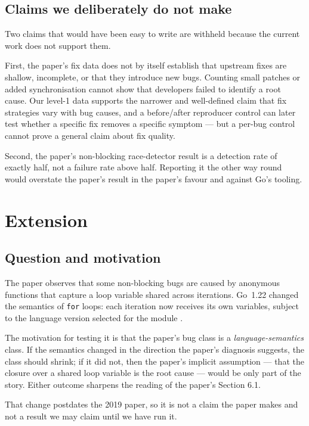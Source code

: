 \documentclass[11pt]{article}
\begin{document}
\subsection{Claims we deliberately do not make}

Two claims that would have been easy to write are withheld because the
current work does not support them.

First, the paper's fix data does not by itself establish that upstream fixes
are shallow, incomplete, or that they introduce new bugs. Counting small
patches or added synchronisation cannot show that developers failed to
identify a root cause. Our level-1 data supports the narrower and
well-defined claim that fix strategies vary with bug causes, and a
before/after reproducer control can later test whether a specific fix
removes a specific symptom --- but a per-bug control cannot prove a general
claim about fix quality.

Second, the paper's non-blocking race-detector result is a detection rate of
exactly half, not a failure rate above half. Reporting it the other way
round would overstate the paper's result in the paper's favour and against
Go's tooling.

\section{Extension}
\label{sec:extension}

\subsection{Question and motivation}

The paper observes that some non-blocking bugs are caused by anonymous
functions that capture a loop variable shared across iterations. Go~1.22
changed the semantics of \texttt{for} loops: each iteration now receives its
own variables, subject to the language version selected for the module
\cite{go122,loopvar}.

The motivation for testing it is that the paper's bug class is a
\emph{language-semantics} class. If the semantics changed in the direction the
paper's diagnosis suggests, the class should shrink; if it did not, then the
paper's implicit assumption --- that the closure over a shared loop variable
is the root cause --- would be only part of the story. Either outcome
sharpens the reading of the paper's Section 6.1.

That change postdates the 2019 paper, so it is not a claim the paper makes and
not a result we may claim until we have run it.
\end{document}
